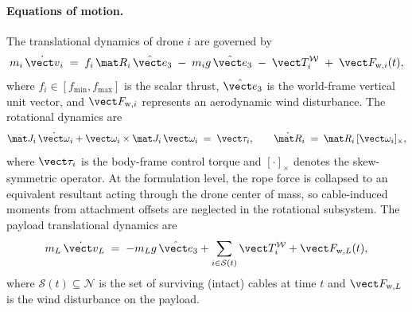 \paragraph{Equations of motion.} The translational dynamics of drone $i$ are governed by
\begin{equation}
 m_i\,\dot{\vect v}_i
    \;=\; f_i\,\mat R_i\,\hat{\vect e}_3
    \;-\; m_i g\,\hat{\vect e}_3
    \;-\; \vect T_i^{\mathcal{W}}
    \;+\; \vect F_{\mathrm{w},i}(t),
  \label{eq:drone-eom}
\end{equation}
where $f_i \in [f_{\min}, f_{\max}]$ is the scalar thrust, $\hat{\vect e}_3$ is the world-frame vertical unit vector, and $\vect F_{\mathrm{w},i}$ represents an aerodynamic wind disturbance. The rotational dynamics are
\begin{equation}
  \mat J_i\,\dot{\vect\omega}_i
    + \vect\omega_i \times \mat J_i\,\vect\omega_i
    \;=\; \vect\tau_i,
  \qquad
  \dot{\mat R}_i \;=\; \mat R_i\,[\vect\omega_i]_\times,
  \label{eq:drone-rot}
\end{equation}
where $\vect\tau_i$ is the body-frame control torque and $[\cdot]_\times$ denotes the skew-symmetric operator. At the formulation level, the rope force is collapsed to an equivalent resultant acting through the drone center of mass, so cable-induced moments from attachment offsets are neglected in the rotational subsystem. The payload translational dynamics are
\begin{equation}
 m_L\,\dot{\vect v}_L
    \;=\; -m_L g\,\hat{\vect e}_3
    + \sum_{i \in \mathcal{S}(t)} \vect T_i^{\mathcal{W}}
    + \vect F_{\mathrm{w},L}(t),
  \label{eq:payload-eom}
\end{equation}
where $\mathcal{S}(t) \subseteq \mathcal{N}$ is the set of surviving (intact) cables at time $t$ and $\vect F_{\mathrm{w}, L}$ is the wind disturbance on the payload.

